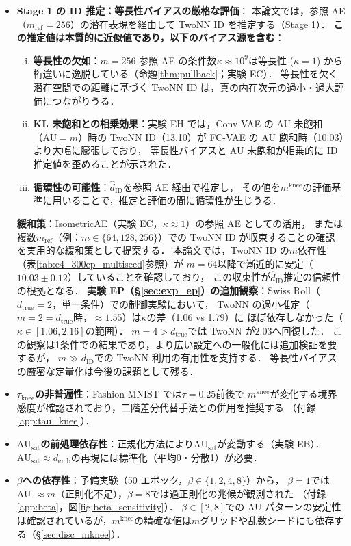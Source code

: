 \documentclass[11pt,a4paper]{jsarticle}
\newcommand{\kap}{\kappa}
\newcommand{\AUsat}{\mathrm{AU}_{\mathrm{sat}}}
\newcommand{\mknee}{m^{\mathrm{knee}}}
\newcommand{\demb}{d_{\mathrm{emb}}}
\begin{document}
\begin{itemize}
  \item \textbf{Stage 1 の ID 推定：等長性バイアスの厳格な評価}：
        本論文では，参照 AE（$m_\mathrm{ref}=256$）の潜在表現を経由して TwoNN ID を推定する（Stage 1）．
        \textbf{この推定値は本質的に近似値であり，以下のバイアス源を含む}：
        \begin{enumerate}[(i)]
          \item \textbf{等長性の欠如}：$m=256$ 参照 AE の条件数$\kap \approx 10^9$は等長性
                ($\kap=1$) から桁違いに逸脱している（命題\ref{thm:pullback}；実験 EC）．
                等長性を欠く潜在空間での距離に基づく TwoNN ID は，真の内在次元の過小・過大評価につながりうる．
          \item \textbf{KL 未飽和との相乗効果}：実験 EH では，Conv-VAE の AU 未飽和（AU$=m$）時の
                TwoNN ID（13.10）が FC-VAE の AU 飽和時（10.03）より大幅に膨張しており，
                等長性バイアスと AU 未飽和が相乗的に ID 推定値を歪めることが示された．
          \item \textbf{循環性の可能性}：$\hat{d}_\mathrm{ID}$を参照 AE 経由で推定し，
                その値を$\mknee$の評価基準に用いることで，推定と評価の間に循環性が生じうる．
        \end{enumerate}
        \textbf{緩和策}：IsometricAE（実験 EC，$\kap \approx 1$）の参照 AE としての活用，
        または複数$m_\mathrm{ref}$（例：$m \in \{64, 128, 256\}$）での TwoNN ID が収束することの確認
        を実用的な緩和策として提案する．
        本論文では，TwoNN ID の$m$依存性（表\ref{tab:e4_300ep_multiseed}参照）が
        $m=64$以降で漸近的に安定（$10.03 \pm 0.12$）していることを確認しており，
        この収束性が$\hat{d}_\mathrm{ID}$推定の信頼性の根拠となる．
        \textbf{実験 EP（§\ref{sec:exp_ep}）の追加観察}：Swiss Roll（$d_\mathrm{true}=2$，単一条件）での制御実験において，
        TwoNN の過小推定（$m=2=d_\mathrm{true}$時，$\approx1.55$）は$\kap$の差（1.06 vs 1.79）に
        ほぼ依存しなかった（$\kap \in [1.06, 2.16]$の範囲）．
        $m=4 > d_\mathrm{true}$では TwoNN が$2.03$へ回復した．
        この観察は1条件での結果であり，より広い設定への一般化には追加検証を要するが，
        $m \gg d_\mathrm{ID}$での TwoNN 利用の有用性を支持する．
        等長性バイアスの厳密な定量化は今後の課題として残る．
  \item \textbf{$\tau_{\mathrm{knee}}$の非普遍性}：Fashion-MNIST では$\tau = 0.25$前後で
        $\mknee$が変化する境界感度が確認されており，二階差分代替手法との併用を推奨する
        （付録\ref{app:tau_knee}）．
  \item \textbf{$\AUsat$の前処理依存性}：正規化方法により$\AUsat$が変動する（実験 EB）．
        $\AUsat \approx \demb$の再現には標準化（平均0・分散1）が必要．
  \item \textbf{$\beta$への依存性}：予備実験（50 エポック，$\beta \in \{1,2,4,8\}$）から，
        $\beta = 1$では AU $\approx m$（正則化不足），$\beta = 8$では過正則化の兆候が観測された
        （付録\ref{app:beta}，図\ref{fig:beta_sensitivity}）．
        $\beta \in [2, 8]$での AU パターンの安定性は確認されているが，$\mknee$の精確な値は$m$グリッドや乱数シードにも依存する（§\ref{sec:disc_mknee}）．
\end{itemize}
\end{document}
